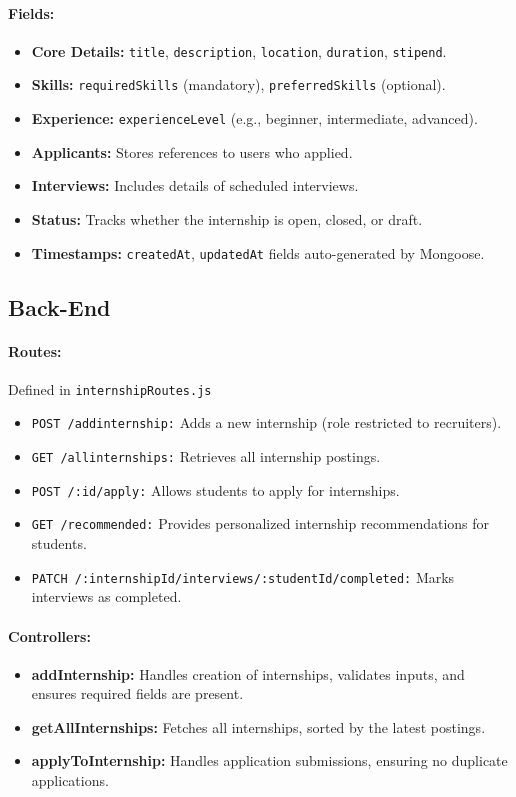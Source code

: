 \paragraph{Fields:}
\begin{itemize}
    \item \textbf{Core Details:} \texttt{title}, \texttt{description}, \texttt{location}, \texttt{duration}, \texttt{stipend}.
    \item \textbf{Skills:} \texttt{requiredSkills} (mandatory), \texttt{preferredSkills} (optional).
    \item \textbf{Experience:} \texttt{experienceLevel} (e.g., beginner, intermediate, advanced).
    \item \textbf{Applicants:} Stores references to users who applied.
    \item \textbf{Interviews:} Includes details of scheduled interviews.
    \item \textbf{Status:} Tracks whether the internship is open, closed, or draft.
    \item \textbf{Timestamps:} \texttt{createdAt}, \texttt{updatedAt} fields auto-generated by Mongoose.
\end{itemize}

\subsection*{Back-End}
\paragraph{Routes:} Defined in \texttt{internshipRoutes.js}
\begin{itemize}
    \item \texttt{POST /addinternship:} Adds a new internship (role restricted to recruiters).
    \item \texttt{GET /allinternships:} Retrieves all internship postings.
    \item \texttt{POST /:id/apply:} Allows students to apply for internships.
    \item \texttt{GET /recommended:} Provides personalized internship recommendations for students.
    \item \texttt{PATCH /:internshipId/interviews/:studentId/completed:} Marks interviews as completed.
\end{itemize}

\paragraph{Controllers:}
\begin{itemize}
    \item \textbf{addInternship:} Handles creation of internships, validates inputs, and ensures required fields are present.
    \item \textbf{getAllInternships:} Fetches all internships, sorted by the latest postings.
    \item \textbf{applyToInternship:} Handles application submissions, ensuring no duplicate applications.
\end{itemize}


